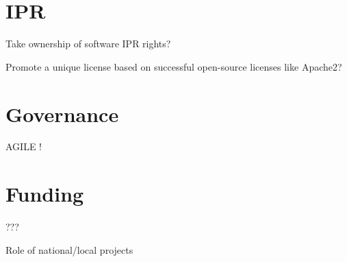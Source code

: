\documentclass[11pt]{article} %
\begin{document}
\section{IPR}

Take ownership of software IPR rights?

Promote a unique license based on successful open-source licenses like Apache2?

\section{Governance}

AGILE !

\section{Funding}

???

Role of national/local projects
\end{document}
